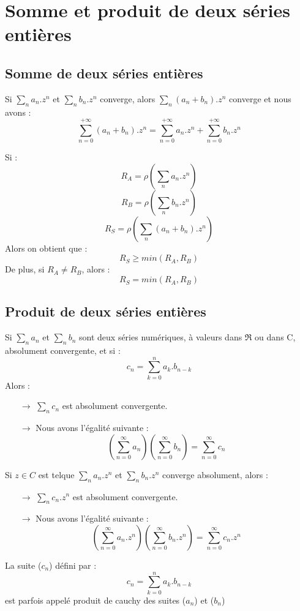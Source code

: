 \section{Somme et produit de deux séries entières}
\subsection{Somme de deux séries entières}
\begin{prop}
Si $\underset{n} \sum a_n.z^n$ et $\underset{n} \sum b_n.z^n$ converge, alors $\underset{n} \sum (a_n+b_n).z^n$ converge et nous avons : 
$$\sum_{n=0}^{+\infty} (a_n+b_n).z^n = \sum_{n=0}^{+\infty} a_n.z^n + \sum_{n=0}^{+\infty} b_n.z^n $$
\end{prop}
\begin{corr}
Si : 
$$R_A = \rho(\sum_n a_n.z^n)$$
$$R_B = \rho(\sum_n b_n.z^n)$$
$$R_S = \rho(\sum_n (a_n+b_n).z^n)$$
Alors on obtient que : 
$$R_S \geq min(R_A,R_B)$$
De plus, si $R_A \neq R_B$, alors :
$$R_S = min(R_A,R_B)$$
\end{corr}
\subsection{Produit de deux séries entières}
\begin{prop}
Si $\underset{n} \sum a_n$ et $\underset{n} \sum b_n$ sont deux séries numériques, à valeurs dans $\Re$ ou dans C, absolument convergente, et si : 
$$c_n = \sum_{k=0}^n a_k.b_{n-k}$$
Alors : \\
\begin{itemize}
 \item[$\rightarrow$] $\underset{n} \sum c_n$ est absolument convergente.\\
 \item[$\rightarrow$] Nous avons l'égalité suivante : 
$$\left(\sum_{n=0}^{\infty} a_n\right)\left(\sum_{n=0}^{\infty} b_n\right) = \sum_{n=0}^{\infty} c_n $$
\end{itemize}
\end{prop}
\begin{prop}
Si $z \in C$ est telque $\underset{n} \sum a_n.z^n$ et $\underset{n} \sum b_n.z^n$ converge absolument, alors : 
\begin{itemize}
 \item[$\rightarrow$] $\underset{n} \sum c_n.z^n$ est absolument convergente.\\
 \item[$\rightarrow$] Nous avons l'égalité suivante : 
$$\left(\sum_{n=0}^{\infty} a_n.z^n\right)\left(\sum_{n=0}^{\infty} b_n.z^n\right) = \sum_{n=0}^{\infty} c_n.z^n $$
\end{itemize}
\end{prop}
\begin{de}
La suite ($c_n$) défini par : 
$$c_n = \sum_{k=0}^n a_k.b_{n-k}$$
est parfois appelé produit de cauchy des suites ($a_n$) et ($b_n$)
\end{de}
